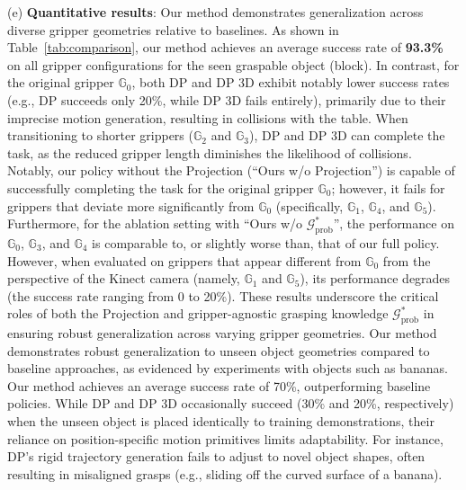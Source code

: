 (e) \textbf{Quantitative results}:
Our method demonstrates generalization across diverse gripper geometries relative to baselines. As shown in Table~\ref{tab:comparison}, our method achieves an average success rate of \textbf{93.3\%} on all gripper configurations for the seen graspable object (block). In contrast, for the original gripper \(\mathbb{G}_0\), both DP and DP 3D exhibit notably lower success rates (e.g., DP succeeds only 20\%, while DP 3D fails entirely), primarily due to their imprecise motion generation, resulting in collisions with the table. When transitioning to shorter grippers (\(\mathbb{G}_2\) and \(\mathbb{G}_3\)), DP and DP 3D can complete the task, as the reduced gripper length diminishes the likelihood of collisions. Notably, our policy without the Projection (``Ours w/o Projection'') is capable of successfully completing the task for the original gripper \(\mathbb{G}_0\); however, it fails for grippers that deviate more significantly from \(\mathbb{G}_0\) (specifically, \(\mathbb{G}_1\), \(\mathbb{G}_4\), and \(\mathbb{G}_5\)). Furthermore, for the ablation setting with ``Ours w/o $\mathcal{G}^*_{\text{prob}}$'', the performance on \(\mathbb{G}_0\), \(\mathbb{G}_3\), and \(\mathbb{G}_4\) is comparable to, or slightly worse than, that of our full policy. However, when evaluated on grippers that appear different from \(\mathbb{G}_0\) from the perspective of the Kinect camera (namely, \(\mathbb{G}_1\) and \(\mathbb{G}_5\)), its performance degrades (the success rate ranging from 0 to 20\%). These results underscore the critical roles of both the Projection and gripper-agnostic grasping knowledge \(\mathcal{G}^*_{\text{prob}}\) in ensuring robust generalization across varying gripper geometries. Our method demonstrates robust generalization to unseen object geometries compared to baseline approaches, as evidenced by experiments with objects such as bananas. Our method achieves an average success rate of 70\%, outperforming baseline policies. While DP and DP 3D occasionally succeed (30\% and 20\%, respectively) when the unseen object is placed identically to training demonstrations, their reliance on position-specific motion primitives limits adaptability. For instance, DP's rigid trajectory generation fails to adjust to novel object shapes, often resulting in misaligned grasps (e.g., sliding off the curved surface of a banana). 






